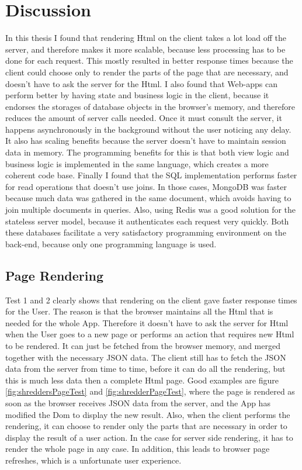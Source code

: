 \chapter{Discussion}
In this thesis I found that rendering Html on the client takes a lot load off the server, and therefore makes it more scalable, because less processing has to be done for each request. This mostly resulted in better response times because the client could choose only to render the parts of the page that are necessary, and doesn't have to ask the server for the Html. I also found that Web-apps can perform better by having state and business logic in the client, because it endorses the storages of database objects in the browser's memory, and therefore reduces the amount of server calls needed. Once it must consult the server, it happens asynchronously in the background without the user noticing any delay. It also has scaling benefits because the server doesn't have to maintain session data in memory. The programming benefits for this is that both view logic and business logic is implemented in the same language, which creates a more coherent code base. Finally I found that the SQL implementation performs faster for read operations that doesn't use joins. In those cases, MongoDB was faster because much data was gathered in the same document, which avoids having to join multiple documents in queries. Also, using Redis was a good solution for the stateless server model, because it authenticates each request very quickly. Both these databases facilitate a very satisfactory programming environment on the back-end, because only one programming language is used. 

\section{Page Rendering}
Test 1 and 2 clearly shows that rendering on the client gave faster response times for the User. The reason is that the browser maintains all the Html that is needed for the whole App. Therefore it doesn't have to ask the server for Html when the User goes to a new page or performs an action that requires new Html to be rendered. It can just be fetched from the browser memory, and merged together with the necessary JSON data. The client still has to fetch the JSON data from the server from time to time, before it can do all the rendering, but this is much less data then a complete Html page.  Good examples are figure \vref{fig:shreddersPageTest} and \vref{fig:shredderPageTest}, where the page is rendered as soon as the browser receives JSON data from the server, and the App has modified the Dom to display the new result. Also, when the client performs the rendering, it can choose to render only the parts that are necessary in order to display the result of a user action. In the case for server side rendering, it has to render the whole page in any case. In addition, this leads to browser page refreshes, which is a unfortunate user experience. 

